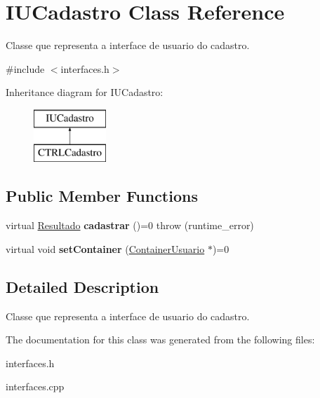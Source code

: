 \hypertarget{classIUCadastro}{}\section{I\+U\+Cadastro Class Reference}
\label{classIUCadastro}


Classe que representa a interface de usuario do cadastro.  




{\ttfamily \#include $<$interfaces.\+h$>$}

Inheritance diagram for I\+U\+Cadastro\+:\begin{figure}[H]
\begin{center}
\leavevmode
\includegraphics[height=2.000000cm]{classIUCadastro}
\end{center}
\end{figure}
\subsection*{Public Member Functions}
\begin{DoxyCompactItemize}
\item 
\mbox{\label{classIUCadastro_af4089cca946d856abae69b931a1dc1e8}} 
virtual \hyperlink{classResultado}{Resultado} {\bfseries cadastrar} ()=0  throw (runtime\+\_\+error)
\item 
\mbox{\label{classIUCadastro_a50128c18e84b837c6f50aaa6f898bf34}} 
virtual void {\bfseries set\+Container} (\hyperlink{classContainerUsuario}{Container\+Usuario} $\ast$)=0
\end{DoxyCompactItemize}


\subsection{Detailed Description}
Classe que representa a interface de usuario do cadastro. 

The documentation for this class was generated from the following files\+:\begin{DoxyCompactItemize}
\item 
interfaces.\+h\item 
interfaces.\+cpp\end{DoxyCompactItemize}
